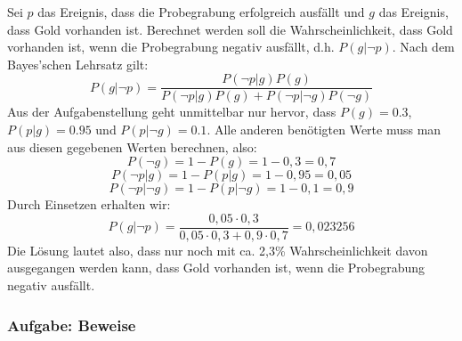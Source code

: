 Sei $p$ das Ereignis, dass die Probegrabung erfolgreich ausfällt und
$g$ das Ereignis, dass Gold vorhanden ist. Berechnet werden soll die
Wahrscheinlichkeit, dass Gold vorhanden ist, wenn die Probegrabung
negativ ausfällt, d.h. $P(g|\neg p)$. Nach dem Bayes'schen Lehrsatz
gilt:
\[ P(g|\neg p) = \frac{P(\neg p|g)P(g)}{P(\neg p|g)P(g) + P(\neg
  p|\neg g)P(\neg g)} \] 
Aus der Aufgabenstellung geht unmittelbar nur
hervor, dass $P(g)=0.3$, $P(p|g)=0.95$ und $P(p|\neg g)=0.1$. Alle
anderen benötigten Werte muss man aus diesen gegebenen Werten
berechnen, also:
\[ P(\neg g) = 1 - P(g) = 1 - 0,3 = 0,7 \]
\[ P(\neg p|g) = 1 - P (p|g) = 1- 0,95 = 0,05 \]
\[ P(\neg p|\neg g) = 1 - P(p|\neg g) = 1 - 0,1 = 0,9 \]
Durch Einsetzen erhalten wir:
\[ P(g|\neg p) = \frac{0,05 \cdot 0,3}{0,05 \cdot 0,3 + 0,9 \cdot 0,7}
= 0,023256 \] 
Die Lösung lautet also, dass nur noch mit ca. 2,3\%
Wahrscheinlichkeit davon ausgegangen werden kann, dass Gold vorhanden
ist, wenn die Probegrabung negativ ausfällt.

\subsubsection*{Aufgabe: Beweise}

